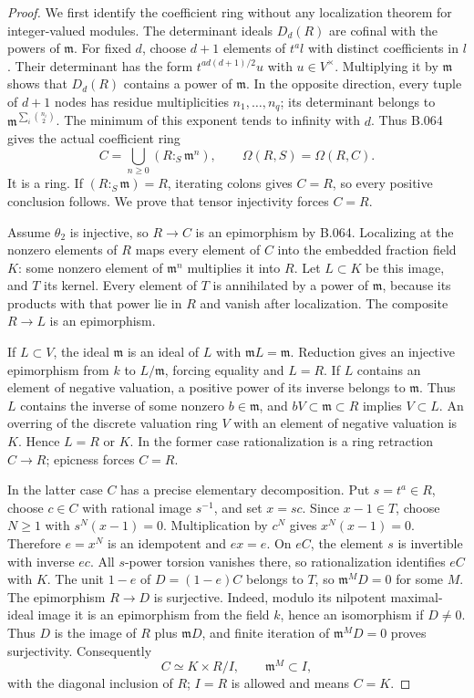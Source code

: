\begin{proof}
We first identify the coefficient ring without any localization theorem
for integer-valued modules. The determinant ideals $D_d(R)$ are cofinal
with the powers of $\mathfrak m$. For fixed $d$, choose $d+1$ elements
of $t^a l$ with distinct coefficients in $l$. Their determinant has
the form $t^{ad(d+1)/2}u$ with $u\in V^\times$. Multiplying it by
$\mathfrak m$ shows that $D_d(R)$ contains a power of $\mathfrak m$.
In the opposite direction, every tuple of $d+1$ nodes has residue
multiplicities $n_1,\ldots,n_q$; its determinant belongs to
$\mathfrak m^{\sum_i\binom{n_i}{2}}$. The minimum of this exponent
tends to infinity with $d$. Thus B.064 gives the actual coefficient ring
\[
 C=\bigcup_{n\ge0}(R:_S\mathfrak m^n),\qquad
                         \Omega(R,S)=\Omega(R,C).         \tag{B75.2}
\]
It is a ring. If $(R:_S\mathfrak m)=R$, iterating colons gives $C=R$,
so every positive conclusion follows. We prove that tensor injectivity
forces $C=R$.

Assume $\theta_2$ is injective, so $R\to C$ is an epimorphism by B.064.
Localizing at the nonzero elements of $R$ maps every element of $C$ into
the embedded fraction field $K$: some nonzero element of
$\mathfrak m^n$ multiplies it into $R$. Let $L\subset K$ be this image,
and $T$ its kernel. Every element of $T$ is annihilated by a power of
$\mathfrak m$, because its products with that power lie in $R$ and
vanish after localization. The composite $R\to L$ is an epimorphism.

If $L\subset V$, the ideal $\mathfrak m$ is an ideal of $L$ with
$\mathfrak mL=\mathfrak m$. Reduction gives an injective epimorphism
from $k$ to $L/\mathfrak m$, forcing equality and $L=R$.
If $L$ contains an element of negative valuation, a positive power of
its inverse belongs to $\mathfrak m$. Thus $L$ contains the inverse of
some nonzero $b\in\mathfrak m$, and $bV\subset\mathfrak m\subset R$
implies $V\subset L$. An overring of the discrete valuation ring $V$
with an element of negative valuation is $K$. Hence $L=R$ or $K$.
In the former case rationalization is a ring retraction $C\to R$;
epicness forces $C=R$.

In the latter case $C$ has a precise elementary decomposition. Put
$s=t^a\in R$, choose $c\in C$ with rational image $s^{-1}$, and set
$x=sc$. Since $x-1\in T$, choose $N\ge1$ with $s^N(x-1)=0$.
Multiplication by $c^N$ gives $x^N(x-1)=0$. Therefore
$e=x^N$ is an idempotent and $ex=e$. On $eC$, the element $s$ is
invertible with inverse $ec$. All $s$-power torsion vanishes there,
so rationalization identifies $eC$ with $K$.
The unit $1-e$ of $D=(1-e)C$ belongs to $T$, so
$\mathfrak m^M D=0$ for some $M$.
The epimorphism $R\to D$ is surjective. Indeed, modulo its nilpotent
maximal-ideal image it is an epimorphism from the field $k$, hence an
isomorphism if $D\ne0$. Thus $D$ is the image of $R$ plus
$\mathfrak mD$, and finite iteration of $\mathfrak m^MD=0$ proves
surjectivity. Consequently
\[
             C\simeq K\times R/I,\qquad
             \mathfrak m^M\subset I,                     \tag{B75.3}
\]
with the diagonal inclusion of $R$; $I=R$ is allowed and means $C=K$.


\end{proof}
